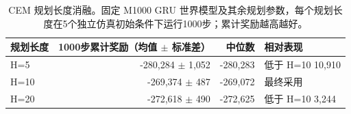 
\begin{table}[H]
\centering
\caption{CEM 规划长度消融。固定 M1000 GRU 世界模型及其余规划参数，每个规划长度在5个独立仿真初始条件下运行1000步；累计奖励越高越好。}
\label{tab:horizon_ablation}
\small
\begin{tabular}{lrrl}
\toprule
规划长度 & 1000步累计奖励（均值 $\pm$ 标准差） & 中位数 & 相对表现 \\
\midrule
H=5 & -280,284 $\pm$ 1,052 & -280,283 & 低于 H=10 10,910 \\
H=10 & -269,374 $\pm$ 487 & -269,072 & 最终采用 \\
H=20 & -272,618 $\pm$ 490 & -272,625 & 低于 H=10 3,244 \\
\bottomrule
\end{tabular}
\end{table}
